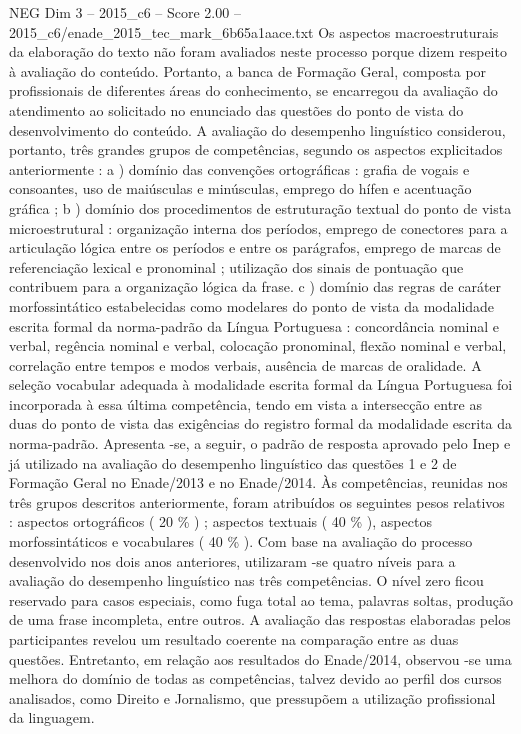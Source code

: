 \begin{textsample}{NEG Dim 3 – 2015\_c6 – Score 2.00 – 2015\_c6/enade\_2015\_tec\_mark\_6b65a1aace.txt}
Os aspectos macroestruturais da elaboração do texto não foram avaliados neste processo porque dizem respeito à avaliação do conteúdo.
Portanto, a banca de Formação Geral, composta por profissionais de diferentes áreas do conhecimento, se encarregou da avaliação do atendimento ao solicitado no enunciado das questões do ponto de vista do desenvolvimento do conteúdo.
A avaliação do desempenho linguístico considerou, portanto, três grandes grupos de competências, segundo os aspectos explicitados anteriormente : a ) domínio das convenções ortográficas : grafia de vogais e consoantes, uso de maiúsculas e minúsculas, emprego do hífen e acentuação gráfica ; b ) domínio dos procedimentos de estruturação textual do ponto de vista microestrutural : organização interna dos períodos, emprego de conectores para a articulação lógica entre os períodos e entre os parágrafos, emprego de marcas de referenciação lexical e pronominal ; utilização dos sinais de pontuação que contribuem para a organização lógica da frase. c ) domínio das regras de caráter morfossintático estabelecidas como modelares do ponto de vista da modalidade escrita formal da norma-padrão da Língua Portuguesa : concordância nominal e verbal, regência nominal e verbal, colocação pronominal, flexão nominal e verbal, correlação entre tempos e modos verbais, ausência de marcas de oralidade.
A seleção vocabular adequada à modalidade escrita formal da Língua Portuguesa foi incorporada à essa última competência, tendo em vista a intersecção entre as duas do ponto de vista das exigências do registro formal da modalidade escrita da norma-padrão.
Apresenta -se, a seguir, o padrão de resposta aprovado pelo Inep e já utilizado na avaliação do desempenho linguístico das questões 1 e 2 de Formação Geral no Enade/2013 e no Enade/2014.
Às competências, reunidas nos três grupos descritos anteriormente, foram atribuídos os seguintes pesos relativos : aspectos ortográficos ( 20 \% ) ; aspectos textuais ( 40 \% ), aspectos morfossintáticos e vocabulares ( 40 \% ).
Com base na avaliação do processo desenvolvido nos dois anos anteriores, utilizaram -se quatro níveis para a avaliação do desempenho linguístico nas três competências.
O nível zero ficou reservado para casos especiais, como fuga total ao tema, palavras soltas, produção de uma frase incompleta, entre outros.
A avaliação das respostas elaboradas pelos participantes revelou um resultado coerente na comparação entre as duas questões.
Entretanto, em relação aos resultados do Enade/2014, observou -se uma melhora do domínio de todas as competências, talvez devido ao perfil dos cursos analisados, como Direito e Jornalismo, que pressupõem a utilização profissional da linguagem.

\end{textsample}

